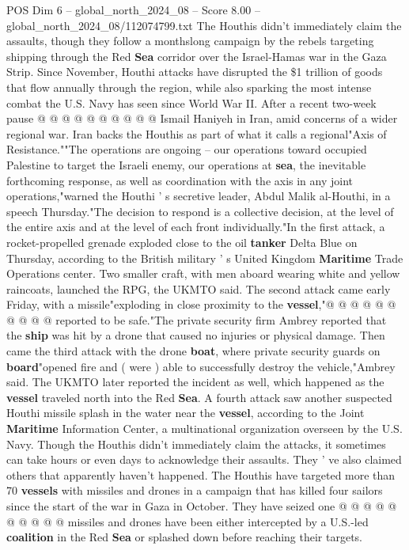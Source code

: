 \begin{textsample}{POS Dim 6 – global\_north\_2024\_08 – Score 8.00 – global\_north\_2024\_08/112074799.txt}
The Houthis didn't immediately claim the assaults, though they follow a monthslong campaign by the rebels targeting shipping through the Red \textbf{Sea} corridor over the Israel-Hamas war in the Gaza Strip.
Since November, Houthi attacks have disrupted the \$1 trillion of goods that flow annually through the region, while also sparking the most intense combat the U.S.
Navy has seen since World War II.
After a recent two-week pause @ @ @ @ @ @ @ @ @ @ Ismail Haniyeh in Iran, amid concerns of a wider regional war.
Iran backs the Houthis as part of what it calls a regional"Axis of Resistance.""The operations are ongoing -- our operations toward occupied Palestine to target the Israeli enemy, our operations at \textbf{sea}, the inevitable forthcoming response, as well as coordination with the axis in any joint operations,"warned the Houthi ' s secretive leader, Abdul Malik al-Houthi, in a speech Thursday."The decision to respond is a collective decision, at the level of the entire axis and at the level of each front individually."In the first attack, a rocket-propelled grenade exploded close to the oil \textbf{tanker} Delta Blue on Thursday, according to the British military ' s United Kingdom \textbf{Maritime} Trade Operations center.
Two smaller craft, with men aboard wearing white and yellow raincoats, launched the RPG, the UKMTO said.
The second attack came early Friday, with a missile"exploding in close proximity to the \textbf{vessel},"@ @ @ @ @ @ @ @ @ @ reported to be safe."The private security firm Ambrey reported that the \textbf{ship} was hit by a drone that caused no injuries or physical damage.
Then came the third attack with the drone \textbf{boat}, where private security guards on \textbf{board}"opened fire and ( were ) able to successfully destroy the vehicle,"Ambrey said.
The UKMTO later reported the incident as well, which happened as the \textbf{vessel} traveled north into the Red \textbf{Sea}.
A fourth attack saw another suspected Houthi missile splash in the water near the \textbf{vessel}, according to the Joint \textbf{Maritime} Information Center, a multinational organization overseen by the U.S.
Navy.
Though the Houthis didn't immediately claim the attacks, it sometimes can take hours or even days to acknowledge their assaults.
They ' ve also claimed others that apparently haven't happened.
The Houthis have targeted more than 70 \textbf{vessels} with missiles and drones in a campaign that has killed four sailors since the start of the war in Gaza in October.
They have seized one @ @ @ @ @ @ @ @ @ @ missiles and drones have been either intercepted by a U.S.-led \textbf{coalition} in the Red \textbf{Sea} or splashed down before reaching their targets.

\end{textsample}
